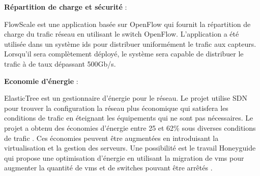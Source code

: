 \textbf{Répartition de charge et sécurité} : 

FlowScale est une application basée sur OpenFlow qui fournit la répartition de charge du trafic réseau en utilisant le switch OpenFlow. L'application a été utilisée dans un système \gls{ids} pour distribuer uniformément le trafic  aux capteurs. Lorsqu'il sera complètement déployé, le système sera capable de distribuer le trafic à de taux dépassant 500Gb/s.  \cite{FlowScale}




\textbf{Economie d'énergie} : 

ElasticTree est un gestionnaire d'énergie pour le réseau. Le projet utilise SDN pour trouver la configuration la réseau plus économique qui satisfera les conditions de trafic en éteignant les équipements qui ne sont pas nécessaires. Le projet a obtenu des économies d'énergie entre 25 et 62\% sous diverses conditions de trafic \cite{Elastictree}. Ces économies peuvent être augmentées en introduisant la virtualisation et la gestion des serveurs. Une possibilité est le travail Honeyguide qui propose une optimisation d'énergie en utilisant la migration de \glspl{vm} pour augmenter la quantité de \glspl{vm} et de switches pouvant être arrêtés \cite{Honeyguide}.




